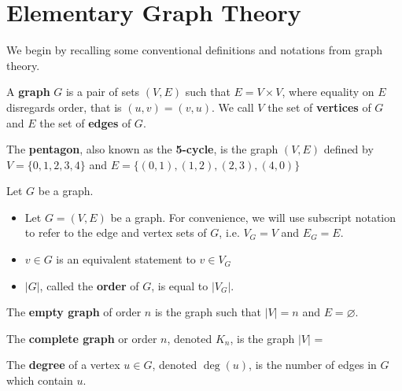 \section{Elementary Graph Theory}




We begin by recalling some conventional definitions and notations from graph
theory.

\begin{definition}
  A \textbf{graph} $G$ is a pair of sets $(V,E)$ such that $E = V \times V$,
  where equality on $E$ disregards order, that is $(u,v) = (v,u)$. We call $V$
  the set of \textbf{vertices} of $G$ and $E$ the set of \textbf{edges} of $G$.
\end{definition}

\begin{example}
  The \textbf{pentagon}, also known as the \textbf{5-cycle}, is the graph
  $(V,E)$ defined by $V = \{0,1,2,3,4\}$ and $E = \{(0,1),(1,2),(2,3),(4,0)\}$
\end{example}

\begin{remark}[Notation]
  Let $G$ be a graph.

  \begin{itemize}
  \item Let $G = (V,E)$ be a graph. For convenience, we will use subscript
    notation to refer to the edge and vertex sets of $G$, i.e. $V_G = V$ and
    $E_G = E$.
  \item $v \in G$ is an equivalent statement to $v \in V_G$
  \item $|G|$, called the \textbf{order} of $G$, is equal to $|V_G|$.
  \end{itemize}
\end{remark}

\begin{example}
  The \textbf{empty graph} of order $n$ is the graph such that $|V| = n$ and $E
  = \varnothing$.

  The \textbf{complete graph} or order $n$, denoted $K_n$, is the graph $|V|$ =
\end{example}

\begin{definition}
  The \textbf{degree} of a vertex $u \in G$, denoted $\deg (u)$, is the number
  of edges in $G$ which contain $u$.
\end{definition}

